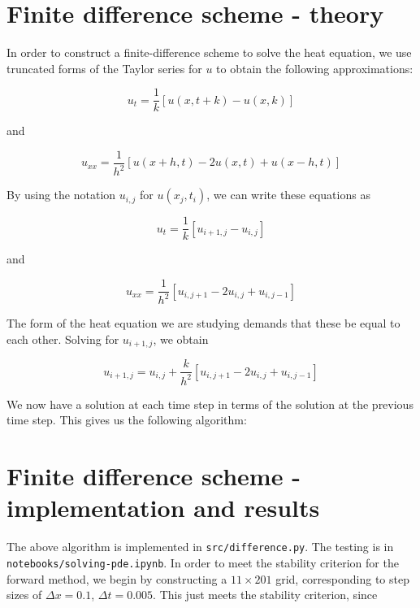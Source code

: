\documentclass{article}
\begin{document}
\section{Finite difference scheme - theory}
In order to construct a finite-difference scheme to solve the heat equation, we use truncated forms of the Taylor series for $u$ to obtain the following approximations:

\begin{equation}
    u_t = \frac{1}{k}[u(x, t + k) - u(x, k)]
\end{equation}

and

\begin{equation}
    u_{xx} = \frac{1}{h^2}[u(x + h, t) - 2u(x, t) + u(x - h, t)]
\end{equation}

By using the notation $u_{i, j}$ for $u(x_j, t_i)$, we can write these equations as

\begin{equation}
    u_t = \frac{1}{k}[u_{i + 1, j} - u_{i, j}]
\end{equation}

and

\begin{equation}
    u_{xx} = \frac{1}{h^2}[u_{i, j+1} - 2u_{i, j} + u_{i, j-1}]
\end{equation}

The form of the heat equation we are studying demands that these be equal to each other. Solving for $u_{i+1, j}$, we obtain

\begin{equation}
    u_{i+1, j} = u_{i, j} + \frac{k}{h^2}[u_{i, j+1} - 2u_{i, j} + u_{i, j-1}]
\end{equation}

We now have a solution at each time step in terms of the solution at the previous time step. This gives us the following algorithm:


\section{Finite difference scheme - implementation and results}
The above algorithm is implemented in \texttt{src/difference.py}. The testing is in \texttt{notebooks/solving-pde.ipynb}. In order to meet the stability criterion for the forward method, we begin by constructing a $11 \times 201$ grid, corresponding to step sizes of $\Delta x = 0.1$, $\Delta t = 0.005$. This just meets the stability criterion, since
\end{document}
